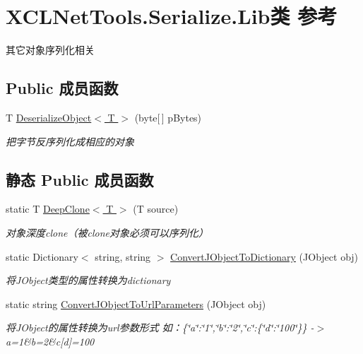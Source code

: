 \hypertarget{class_x_c_l_net_tools_1_1_serialize_1_1_lib}{}\section{X\+C\+L\+Net\+Tools.\+Serialize.\+Lib类 参考}
\label{class_x_c_l_net_tools_1_1_serialize_1_1_lib}


其它对象序列化相关  


\subsection*{Public 成员函数}
\begin{DoxyCompactItemize}
\item 
T \hyperlink{class_x_c_l_net_tools_1_1_serialize_1_1_lib_ae2d400cea76a1f11f5141deab7c6d2b1}{Deserialize\+Object$<$ T $>$} (byte\mbox{[}$\,$\mbox{]} p\+Bytes)
\begin{DoxyCompactList}\small\item\em 把字节反序列化成相应的对象 \end{DoxyCompactList}\end{DoxyCompactItemize}
\subsection*{静态 Public 成员函数}
\begin{DoxyCompactItemize}
\item 
static T \hyperlink{class_x_c_l_net_tools_1_1_serialize_1_1_lib_ad38f60aaa57643027af6ebc86ef7fe18}{Deep\+Clone$<$ T $>$} (T source)
\begin{DoxyCompactList}\small\item\em 对象深度clone（被clone对象必须可以序列化） \end{DoxyCompactList}\item 
static Dictionary$<$ string, string $>$ \hyperlink{class_x_c_l_net_tools_1_1_serialize_1_1_lib_a78ec8810cf5fd723c9efb1b77c725016}{Convert\+J\+Object\+To\+Dictionary} (J\+Object obj)
\begin{DoxyCompactList}\small\item\em 将\+J\+Object类型的属性转换为dictionary \end{DoxyCompactList}\item 
static string \hyperlink{class_x_c_l_net_tools_1_1_serialize_1_1_lib_a1abb5037041804cc79336bd031c3f4df}{Convert\+J\+Object\+To\+Url\+Parameters} (J\+Object obj)
\begin{DoxyCompactList}\small\item\em 将\+J\+Object的属性转换为url参数形式 如：\{\char`\"{}a\char`\"{}\+:\char`\"{}1\char`\"{},\char`\"{}b\char`\"{}\+:\char`\"{}2\char`\"{},\char`\"{}c\char`\"{}\+:\{\char`\"{}d\char`\"{}\+:\char`\"{}100\char`\"{}\}\} -\/$>$ a=1\&b=2\&c\mbox{[}d\mbox{]}=100 \end{DoxyCompactList}\end{DoxyCompactItemize}


